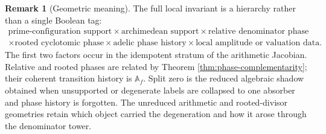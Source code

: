 \documentclass[11pt]{amsart}
\numberwithin{equation}{section}
\theoremstyle{definition}
\newtheorem{remark}[theorem]{Remark}
\begin{document}
\begin{remark}[Geometric meaning]
The full local invariant is a hierarchy rather than a single Boolean tag:
\[
\begin{gathered}
\text{prime-configuration support}
\times
\text{archimedean support}
\times
\text{relative denominator phase}
\\
\times
\text{rooted cyclotomic phase}
\times
\text{adelic phase history}
\times
\text{local amplitude or valuation data}.
\end{gathered}
\]
The first two factors occur in the idempotent stratum of the arithmetic
Jacobian.  Relative and rooted phases are related by Theorem
\ref{thm:phase-complementarity}; their coherent transition history is
$\mathbb A_f$.  Split zero is the reduced algebraic shadow obtained when
unsupported or degenerate labels are collapsed to one absorber and phase
history is forgotten.  The unreduced arithmetic and rooted-divisor
geometries retain which object carried the degeneration and how it arose
through the denominator tower.
\end{remark}
\end{document}
